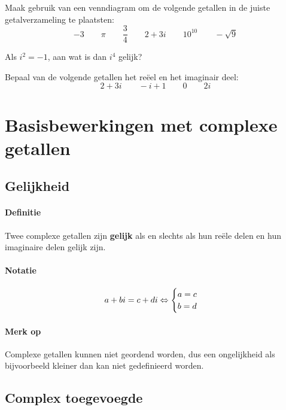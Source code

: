 \documentclass[12pt,twoside]{article}
\begin{document}
\begin{oefening}
  Maak gebruik van een venndiagram om de volgende getallen in de juiste getalverzameling te plaatsten:
  $$-3\qquad\pi\qquad\dfrac{3}{4}\qquad2+3i\qquad10^{10}\qquad-\sqrt{9}$$
\end{oefening}

\begin{oefening}
  Als $i^2=-1$, aan wat is dan $i^4$ gelijk?
\end{oefening}

\begin{oefening}
  Bepaal van de volgende getallen het reëel en het imaginair deel:
  $$2+3i\qquad -i+1\qquad 0 \qquad 2i$$
\end{oefening}

\pagebreak
\section{Basisbewerkingen met complexe getallen}

\subsection{Gelijkheid}

\paragraph*{Definitie}
\begin{mdframed}
Twee complexe getallen zijn {\bf gelijk} als en slechts als hun reële delen en hun imaginaire delen gelijk zijn.
\end{mdframed}

\paragraph*{Notatie}
$$a+bi = c+di \Leftrightarrow \begin{cases}a=c \\ b=d\end{cases}$$

\paragraph*{Merk op}
Complexe getallen kunnen niet geordend worden, dus een ongelijkheid als bijvoorbeeld kleiner dan kan niet gedefinieerd worden.

\subsection{Complex toegevoegde}
\end{document}
